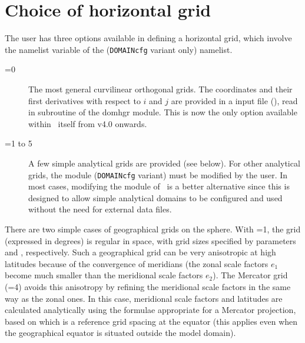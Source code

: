 \documentclass[../main/NEMO_manual]{subfiles}
\begin{document}
\section{Choice of horizontal grid}
\label{sec:DOMCFG_hor}

\begin{listing}
  \caption{}
  \label{lst:namdom_domcfg}
\end{listing}

The user has three options available in defining a horizontal grid, which involve the
namelist variable  of the  (\texttt{DOMAINcfg} variant only)
namelist.

\begin{description}
 \item [{=0}]  The most general curvilinear orthogonal grids.
  The coordinates and their first derivatives with respect to $i$ and $j$ are provided
  in a input file (), read in  subroutine of the domhgr module.
  This is now the only option available within \NEMO\ itself from v4.0 onwards.
\item [{=1 to 5}] A few simple analytical grids are provided (see below).
  For other analytical grids, the  module (\texttt{DOMAINcfg} variant) must be
  modified by the user. In most cases, modifying the  module of \NEMO\ is
  a better alternative since this is designed to allow simple analytical domains to be
  configured and used without the need for external data files.
\end{description}

There are two simple cases of geographical grids on the sphere. With
=1, the grid (expressed in degrees) is regular in space,
with grid sizes specified by parameters  and ,
respectively. Such a geographical grid can be very anisotropic at high latitudes
because of the convergence of meridians (the zonal scale factors $e_1$
become much smaller than the meridional scale factors $e_2$). The Mercator
grid (=4) avoids this anisotropy by refining the meridional scale
factors in the same way as the zonal ones. In this case, meridional scale factors
and latitudes are calculated analytically using the formulae appropriate for
a Mercator projection, based on  which is a reference grid spacing
at the equator (this applies even when the geographical equator is situated outside
the model domain).
\end{document}
